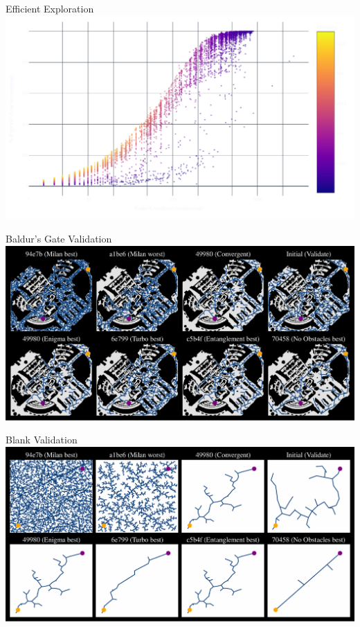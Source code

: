 \documentclass[aspectratio=169]{beamer}
\begin{document}
\begin{frame}{Efficient Exploration}
    \centering
    \includegraphics[width=0.85\linewidth, keepaspectratio]{figures/efficient_overview.pdf}
\end{frame}

\begin{frame}{Baldur's Gate Validation}
    \includegraphics[width=1.0\linewidth, keepaspectratio]{figures/baldurs_val.pdf}
\end{frame}

\begin{frame}{Blank Validation}
    \includegraphics[width=1.0\linewidth, keepaspectratio]{figures/blank_val.pdf}
\end{frame}
\end{document}
